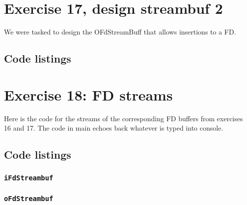 \documentclass[11pt]{article}
\begin{document}
\section*{Exercise 17, design streambuf 2}
We were tasked to design the OFdStreamBuff that allows insertions to a FD.

\subsection*{Code listings}












\section*{Exercise 18: FD streams}
Here is the code for the streams of the corresponding FD buffers from exercises 16 and 17.
The code in main echoes back whatever is typed into console.

\subsection*{Code listings}



\subsubsection*{\texttt{iFdStreambuf}}




\subsubsection*{\texttt{oFdStreambuf}}



\end{document}
